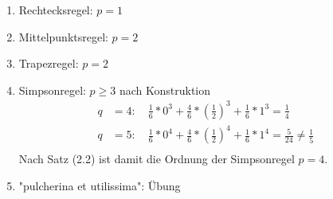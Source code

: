 \begin{example}
\begin{description}
  \item
\end{description}

\begin{enumerate}
  \item Rechtecksregel: $p=1$
  \item Mittelpunktsregel: $p=2$
  \item Trapezregel: $p=2$
  \item Simpsonregel: $p \geq 3$ nach Konstruktion \\
  \begin{align*}
  q &= 4: \quad \frac{1}{6} * 0^3 + \frac{4}{6} * \left(\frac{1}{2}\right)^3 + \frac{1}{6}*1^3 = \frac{1}{4} &\\
  q &= 5: \quad \frac{1}{6} * 0^4 + \frac{4}{6} * \left(\frac{1}{2}\right)^4 + \frac{1}{6}*1^4 = \frac{5}{24} \neq \frac{1}{5}&\\
  \end{align*}
  Nach Satz (2.2) ist damit die Ordnung der Simpsonregel $p=4$.
  \item "pulcherina et utilissima": Übung
\end{enumerate}
\end{example}

\begin{comment}
Zu vergebenen paarweise verschiedenen Knoten $c_1, ..., c_s$ lässt sich mit Satz (2.2) für $p=s$ ein lineares Gleichungssystem für die Gewichte $b_1, ..., b_s$ aufstellen.\\

$$
\underbrace{\left[ \begin{array}{rrrr}
1 & 1 & ... & 1 \\
c_1 & c_2 & ... & c_s \\
\vdots & \vdots &  & \vdots \\
c_1^{s-1} & c_2^{s-1} & ... & c_s^{s-1} \\
\end{array}\right]}_{= V}
*
\left[ \begin{array}{r}
b_1 \\
b_2 \\
\vdots \\
b_s \\
\end{array}\right] 
= 
\left[ \begin{array}{r}
1 \\
1/2 \\
\vdots \\
1/s \\
\end{array}\right] 
$$
Falls die Vandermonde-Matrix V invertierbar ist, so lassen sich die Gewichte $b_1, ..., b_s$ bestimmen, sodass die QF $(b_i, c_i)_{i = 1}^{s}$ mindestens Ordnung $s$ hat.
\end{comment}

